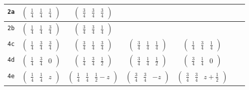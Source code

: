 \documentclass[fleqn,9pt,landscape]{jsarticle}
\begin{document}
\begin{center}
\begin{longtable}{ccccccc}
{\tt 2a} & $ \begin{pmatrix} \frac{1}{4} & \frac{1}{4} & \frac{1}{4} \end{pmatrix} $ & $ \begin{pmatrix} \frac{3}{4} & \frac{3}{4} & \frac{3}{4} \end{pmatrix} $ & $  $ & $  $ & $  $ & $  $ \\ \hline
{\tt 2b} & $ \begin{pmatrix} \frac{1}{4} & \frac{1}{4} & \frac{3}{4} \end{pmatrix} $ & $ \begin{pmatrix} \frac{3}{4} & \frac{3}{4} & \frac{1}{4} \end{pmatrix} $ & $  $ & $  $ & $  $ & $  $ \\ \hline
{\tt 4c} & $ \begin{pmatrix} \frac{1}{4} & \frac{3}{4} & \frac{3}{4} \end{pmatrix} $ & $ \begin{pmatrix} \frac{3}{4} & \frac{1}{4} & \frac{3}{4} \end{pmatrix} $ & $ \begin{pmatrix} \frac{3}{4} & \frac{1}{4} & \frac{1}{4} \end{pmatrix} $ & $ \begin{pmatrix} \frac{1}{4} & \frac{3}{4} & \frac{1}{4} \end{pmatrix} $ & $  $ & $  $ \\ \hline
{\tt 4d} & $ \begin{pmatrix} \frac{1}{4} & \frac{3}{4} & 0 \end{pmatrix} $ & $ \begin{pmatrix} \frac{1}{4} & \frac{3}{4} & \frac{1}{2} \end{pmatrix} $ & $ \begin{pmatrix} \frac{3}{4} & \frac{1}{4} & \frac{1}{2} \end{pmatrix} $ & $ \begin{pmatrix} \frac{3}{4} & \frac{1}{4} & 0 \end{pmatrix} $ & $  $ & $  $ \\ \hline
{\tt 4e} & $ \begin{pmatrix} \frac{1}{4} & \frac{1}{4} & z \end{pmatrix} $ & $ \begin{pmatrix} \frac{1}{4} & \frac{1}{4} & \frac{1}{2} - z \end{pmatrix} $ & $ \begin{pmatrix} \frac{3}{4} & \frac{3}{4} & - z \end{pmatrix} $ & $ \begin{pmatrix} \frac{3}{4} & \frac{3}{4} & z + \frac{1}{2} \end{pmatrix} $ & $  $ & $  $ \\ \hline

\end{longtable}
\end{center}
\end{document}
